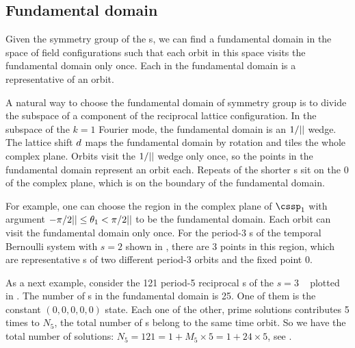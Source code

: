 

\subsection{Fundamental domain} %

Given the symmetry group of the {\lattstate}s,
we can find a fundamental domain in the space of field configurations
such that each orbit in this space visits the fundamental domain only once.
Each {\lattstate} in the fundamental domain is a representative {\lattstate} of an
orbit.

A natural way to choose the fundamental domain of \Cn{\cl{}} symmetry group
is to divide the subspace of a component of the reciprocal lattice configuration.
In the subspace of the $k=1$ Fourier mode, the fundamental domain is an $1/{||}$
wedge. The lattice shift $d$ maps the fundamental domain by rotation and
tiles the whole complex plane. Orbits visit the $1/{||}$
wedge only once, so the points in the fundamental domain represent an orbit each.
Repeats of the shorter {\lattstate}s sit on the 0 of the complex plane, which is on
the boundary of the fundamental domain.

For example, one can choose the region in the complex plane of $\cssp_1$ with
argument $-\pi/2{||}\leq\theta_1<\pi/2{||}$ to be the fundamental domain.
Each orbit can visit the fundamental domain only once. For the period-3 {\lattstate}s
of the {temporal Bernoulli system} with $s=2$ shown in ,
there are 3 points in this region, which are representative {\lattstate}s of two different
period-3 orbits and the fixed point $0$.

As a next example, consider the 121 period-5 reciprocal {\lattstate}s
of the $s=3$ \templatt\  plotted in .
The number of {\lattstate}s in the fundamental domain is 25. One of
them is the constant $(0,0,0,0,0)$ state. Each one of the other, prime
solutions contributes 5 times to $N_5$, the total number of {\lattstate}s
belong to the same time orbit. So we have the total number of solutions:
$N_5=121=1+M_5\times5 = 1+24\times5$, see  .

